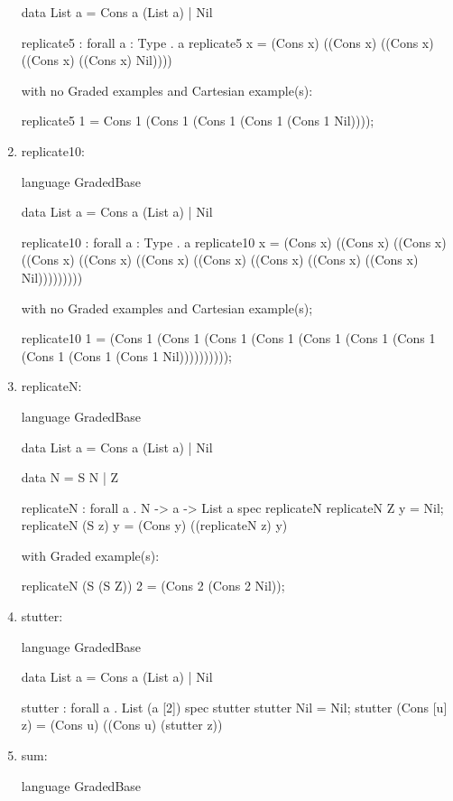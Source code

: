 \begin{enumerate}
\begin{granule}
data List a =  Cons a (List a) | Nil 

replicate5 : forall { a : Type} . a %
replicate5 x = (Cons x) ((Cons x) ((Cons x) ((Cons x) ((Cons x) Nil))))
\end{granule}
with no Graded examples and Cartesian example(s):
\begin{granule}
replicate5 1 = Cons 1 (Cons 1 (Cons 1 (Cons 1 (Cons 1 Nil))));
\end{granule}
\item replicate10: 
\begin{granule}
language GradedBase

data List a =  Cons a (List a) | Nil 

replicate10 : forall { a : Type} . a %
replicate10 x = (Cons x) ((Cons x) ((Cons x) ((Cons x) ((Cons x) ((Cons x) ((Cons x) ((Cons x) ((Cons x) ((Cons x) Nil)))))))))
\end{granule}
with no Graded examples and Cartesian example(s);
\begin{granule}
replicate10 1 = (Cons 1 (Cons 1 (Cons 1 (Cons 1 (Cons 1 (Cons 1 (Cons 1 (Cons 1 (Cons 1 (Cons 1 Nil))))))))));
\end{granule}
\item replicateN: 
\begin{granule}
language GradedBase

data List a =  Cons a (List a) | Nil 

data N = S N | Z
    
replicateN : forall a 
           . N %
           -> a %
           -> List a
spec
    replicateN %
replicateN Z y = Nil;
replicateN (S z) y = (Cons y) ((replicateN z) y)
\end{granule}
with Graded example(s):
\begin{granule}
replicateN (S (S Z)) 2 = (Cons 2 (Cons 2 Nil));
\end{granule}
\item stutter:
\begin{granule}
language GradedBase

data List a = Cons a (List a) | Nil

stutter : forall a . List (a [2]) %
spec
    stutter %
stutter Nil = Nil;
stutter (Cons [u] z) = (Cons u) ((Cons u) (stutter z))
\end{granule}
\item sum:
\begin{granule}
language GradedBase 


\end{granule}
\end{enumerate}
